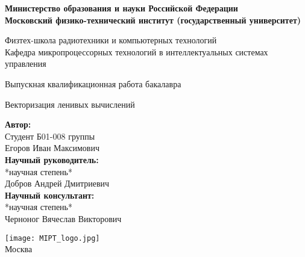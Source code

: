 \begin{center}
    \large\textbf{Министерство образования и науки Российской Федерации \\
    Московский физико-технический институт (государственный
    университет)} \\
    \vspace{1cm}

    Физтех-школа радиотехники и компьютерных технологий \\

    Кафедра микропроцессорных технологий в интеллектуальных системах управления \\

    \vspace{3em}

    Выпускная квалификационная работа бакалавра
\end{center}

\begin{center}
    \vspace{\fill}
    \LARGE{Векторизация ленивых вычислений}

    \vspace{\fill}
\end{center}


\begin{flushright}
    \textbf{Автор:} \\
    Студент Б01-008 группы \\
    Егоров Иван Максимович \\
    \vspace{2em}
    \textbf{Научный руководитель:} \\
    *научная степень* \\
    Добров Андрей Дмитриевич \\
    \vspace{2em}
    \textbf{Научный консультант:} \\
    *научная степень* \\
    Черноног Вячеслав Викторович \\
\end{flushright}

\vspace{7em}

\begin{center}
    \texttt{[image: MIPT\_logo.jpg]}\\
    Москва \the\year{}
\end{center}

\thispagestyle{empty}

\newpage
\setcounter{page}{2}
\fancyfoot[c]{\thepage}
\fancyhead[R]{}